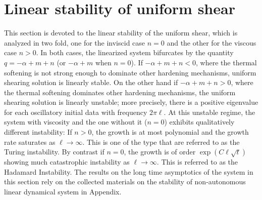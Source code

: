 \documentclass[a4paper,11pt]{article}
\theoremstyle{remark}
\begin{document}
\section{Linear stability of uniform shear}
This section is devoted to the linear stability of the uniform shear, which is analyzed in two fold, one for the inviscid case $n=0$ and the other for the viscous case $n>0$. In both cases, the linearized system bifurcates by the quantity $q=-\alpha+m+n$ (or $-\alpha+m$ when $n=0$). If $-\alpha+m+n<0$, where the thermal softening is not strong enough to dominate other hardening mechanisms, uniform shearing solution is linearly stable. On the other hand if $-\alpha+m+n>0$, where the thermal softening dominates other hardening mechanisms, the uniform shearing solution is linearly unstable; more precisely, there is a positive eigenvalue for each oscillatory initial data with frequency $2\pi\ell$. At this unstable regime, the system with viscosity and the one without it ($n=0$) exhibits qualitatively different instability: If $n>0$, the growth is at most polynomial and the growth rate saturates as $\ell \rightarrow \infty$. This is one of the type that are referred to as the Turing instability. By contrast if $n=0$, the growth is of order $\exp\left(C\ell\sqrt{t}\right)$ showing much catastrophic instability as $\ell \rightarrow \infty$. This is referred to as the Hadamard Instability. The results on the long time asymptotics of the system in this section rely on the collected materials on the stability of non-autonomous linear dynamical system in Appendix.
\end{document}

